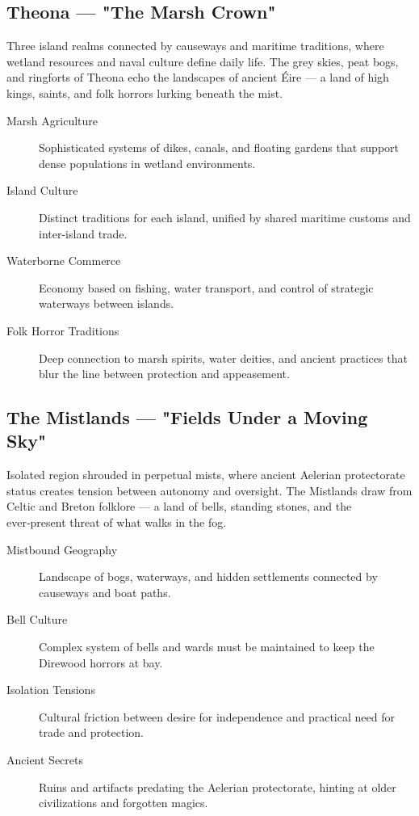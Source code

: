 \subsection*{Theona — "The Marsh Crown"}

Three island realms connected by causeways and maritime traditions, where wetland resources and naval culture define daily life. The grey skies, peat bogs, and ringforts of Theona echo the landscapes of ancient Éire — a land of high kings, saints, and folk horrors lurking beneath the mist.

\begin{description}
\item[Marsh Agriculture] Sophisticated systems of dikes, canals, and floating gardens that support dense populations in wetland environments.
\item[Island Culture] Distinct traditions for each island, unified by shared maritime customs and inter-island trade.
\item[Waterborne Commerce] Economy based on fishing, water transport, and control of strategic waterways between islands.
\item[Folk Horror Traditions] Deep connection to marsh spirits, water deities, and ancient practices that blur the line between protection and appeasement.
\end{description}

\subsection*{The Mistlands — "Fields Under a Moving Sky"}

Isolated region shrouded in perpetual mists, where ancient Aelerian protectorate status creates tension between autonomy and oversight. The Mistlands draw from Celtic and Breton folklore — a land of bells, standing stones, and the ever‑present threat of what walks in the fog.

\begin{description}
\item[Mistbound Geography] Landscape of bogs, waterways, and hidden settlements connected by causeways and boat paths.
\item[Bell Culture] Complex system of bells and wards must be maintained to keep the Direwood horrors at bay.
\item[Isolation Tensions] Cultural friction between desire for independence and practical need for trade and protection.
\item[Ancient Secrets] Ruins and artifacts predating the Aelerian protectorate, hinting at older civilizations and forgotten magics.
\end{description}

